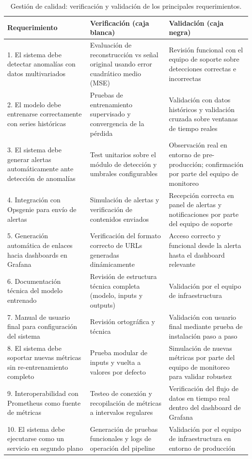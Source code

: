 \documentclass[
11pt, %
]{charter}
\begin{document}
\begin{table}[H]
\centering
\begin{tabular}{|p{4cm}|p{5cm}|p{5cm}|}
\hline
\rowcolor[HTML]{C0C0C0} \textbf{Requerimiento}& \textbf{Verificación (caja blanca)} & \textbf{Validación (caja negra)} \\
\hline
1. El sistema debe detectar anomalías con datos multivariados & Evaluación de reconstrucción vs señal original usando error cuadrático medio (MSE) & Revisión funcional con el equipo de soporte sobre detecciones correctas e incorrectas\\
\hline
2. El modelo debe entrenarse correctamente con series históricas & Pruebas de entrenamiento supervisado y convergencia de la pérdida & Validación con datos históricos y validación cruzada sobre ventanas de tiempo reales \\
\hline
3. El sistema debe generar alertas automáticamente ante detección de anomalías & Test unitarios sobre el módulo de detección y umbrales configurables & Observación real en entorno de pre-producción; confirmación por parte del equipo de monitoreo\\
\hline
4. Integración con Opsgenie para envío de alertas & Simulación de alertas y verificación de contenidos enviados& Recepción correcta en panel de alertas y notificaciones por parte del equipo de soporte\\
\hline
5. Generación automática de enlaces hacia dashboards en Grafana & Verificación del formato correcto de URLs generadas dinámicamente & Acceso correcto y funcional desde la alerta hasta el dashboard relevante \\
\hline
6. Documentación técnica del modelo entrenado & Revisión de estructura técnica completa (modelo, inputs y outputs)& Validación por el equipo de infraestructura\\
\hline
7. Manual de usuario final para configuración del sistema & Revisión ortográfica y técnica& Validación con usuario final mediante prueba de instalación paso a paso \\
\hline
8. El sistema debe soportar nuevas métricas sin re-entrenamiento completo& Prueba modular de inputs y vuelta a valores por defecto& Simulación de nuevas métricas por parte del equipo de monitoreo para validar robustez \\
\hline
9. Interoperabilidad con Prometheus como fuente de métricas & Testeo de conexión y recopilación de métricas a intervalos regulares& Verificación del flujo de datos en tiempo real dentro del dashboard de Grafana \\
\hline
10. El sistema debe ejecutarse como un servicio en segundo plano & Generación de pruebas funcionales y logs de operación del pipeline& Validación por el equipo de infraestructura en entorno de producción \\
\hline
\end{tabular}
\caption{Gestión de calidad: verificación y validación de los principales requerimientos.}
\end{table}
\end{document}
